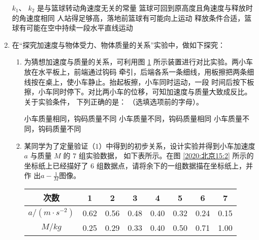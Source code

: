 \begin{enumerate}
\fourchoices
{$ k_{1} $、 $ k_{2} $ 是与篮球转动角速度无关的常量}
{篮球可回到原高度且角速度与释放时的角速度相同}
{人站得足够高，落地前篮球有可能向上运动}
{释放条件合适，篮球有可能在空中持续一段水平直线运动}





\gaokaosy

\item
在“探究加速度与物体受力、物体质量的关系”实验中，做如下探究：
\begin{figure}[h!]
\centering

\caption{}\label{2020:北京15:1}
\end{figure}
\begin{enumerate}
\item
为猜想加速度与质量的关系，可利用图 \ref{2020:北京15:1} 所示装置进行对比实验。两小车放在水平板上，前端通过钩码
牵引，后端各系一条细线，用板擦把两条细线按在桌上，使小车静止。抬起板擦，小车同时运动，一段
时间后按下板擦，小车同时停下。对比两小车的位移，可知加速度与质量大致成反比。关于实验条件，
下列正确的是：
\underlinegap 
（选填选项前的字母）。


\threechoices
{小车质量相同，钩码质量不同}
{小车质量不同，钩码质量相同}
{小车质量不同，钩码质量不同}

\item 
某同学为了定量验证（$ 1 $）中得到的初步关系，设计实验并得到小车加速度 $ a $ 与质量 $ M $ 的 $ 7 $ 组实验数据，
如下表所示。在图 \ref{2020:北京15:2} 所示的坐标纸上已经描好了 $ 6 $ 组数据点，请将余下的一组数据描在坐标纸上，并作
出$a-\frac{1}{M}$图像。
\begin{table}[h!]
\centering 
\begin{tabular}{|c|c|c|c|c|c|c|c|}
\hline 次数 & 1 & 2 & 3 & 4 & 5 & 6 & 7 \\
\hline$a /\left(m \cdot s^{-2}\right)$ & 0.62 & 0.56 & 0.48 & 0.40 & 0.32 & 0.24 & 0.15 \\
\hline$M / kg$ & 0.25 & 0.29 & 0.33 & 0.40 & 0.50 & 0.71 & 1.00 \\
\hline
\end{tabular}
\end{table} 
\begin{figure}[h!]
\centering
\begin{tikzpicture}[scale=0.8]
	

\end{tikzpicture}
\end{figure}
\end{enumerate}
\end{enumerate}

